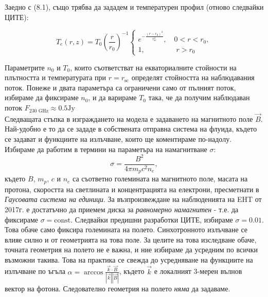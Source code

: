 Заедно с (8.1), също трябва да зададем и температурен профил (отново следвайки ЦИТЕ):

\begin{equation}
	T_e(r,z) = T_0\left(\frac{r}{r_0}\right)^{-1}
	\begin{cases}
		e^{-\frac{(r-r_0)^2}{r^2_{\text{sc}}}},\quad 0 < r < r_0,\\
		1,\,\,\qquad\qquad r>r_0
	\end{cases}
\end{equation}

Параметрите $n_0$ и $T_0$, които съответстват на екваториалните стойности на плътността и температурата при $r = r_\text{sc}$ определят стойността на наблюдавания поток. Понеже и двата параметъра са ограничени само от пълният поток, избираме да фиксираме $n_0$, и да варираме $T_0$ така, че да получим наблюдаван поток $F_{\text{230 GHz}} \approx 0.5 \text{Jy}$\\

Следващата стъпка в изграждането на модела е задаването на магнитното поле $\vec{B}$. Най-удобно е то да се зададе в собствената отправна система на флуида, където се задават и функциите на излъчване, които ще коментираме по-надолу. Избираме да работим в термини на параметъра на намагнитване $\sigma$:
\begin{equation}
	\sigma = \frac{B^2}{4\pi m_pc^2n_e},
\end{equation}
където $B$, $m_p$, $c$ и $n_e$ са съответно големината на магнитното поле, масата на протона, скоростта на светлината и концентрацията на електрони, пресметнати в \emph{Гаусовата система на единици}. За възпроизвеждане на наблюденията на EHT от 2017г. е достатъчно да приемем диска за \emph{равномерно намагнитен} - т.е. да фиксираме $\sigma = \text{const}$. Следвайки предишни разработки ЦИТЕ, избираме $\sigma = 0.01$. Това обаче само фиксира големината на полето. Синхотронното излъчване се влияе силно и от геометрията на това поле. За целите на това изследване обаче, точната геометрия на полето не е важна, и ние избираме да усредним по всички възможни такива. Това на практика се свежда до усредняване на функциите на излъчване по ъгъла $\alpha = \arccos\frac{\vec{k}\cdot\vec{B}}{|\vec{k}||\vec{B}|}$, където $\vec{k}$ е локалният 3-мерен вълнов вектор на фотона. Следователно геометрия на полето \emph{няма} да задаваме.\\

